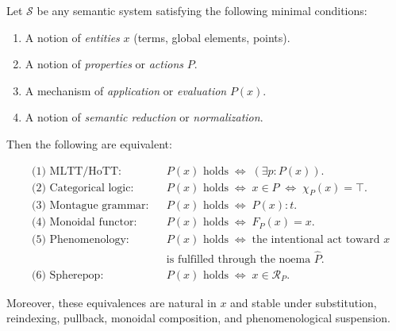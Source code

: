 \documentclass[12pt,letterpaper]{article}
\begin{document}
\begin{theorem}
Let $\mathcal{S}$ be any semantic system satisfying the following minimal
conditions:

\begin{enumerate}
    \item A notion of \emph{entities} $x$ (terms, global elements, points).
    \item A notion of \emph{properties} or \emph{actions} $P$.
    \item A mechanism of \emph{application} or \emph{evaluation} $P(x)$.
    \item A notion of \emph{semantic reduction} or \emph{normalization}.
\end{enumerate}

Then the following are equivalent:

\[
\boxed{
\begin{aligned}
&\text{(1) MLTT/HoTT:} && P(x) \text{ holds} \;\Longleftrightarrow\; (\exists p : P(x)). \\
&\text{(2) Categorical logic:} && P(x) \text{ holds} \;\Longleftrightarrow\; x \in P \;\Longleftrightarrow\; \chi_P(x)=\top. \\
&\text{(3) Montague grammar:} && P(x) \text{ holds} \;\Longleftrightarrow\; P(x) : t. \\
&\text{(4) Monoidal functor:} && P(x) \text{ holds} \;\Longleftrightarrow\; F_P(x) = x. \\
&\text{(5) Phenomenology:} && P(x) \text{ holds} \;\Longleftrightarrow\; \text{the intentional act toward } x \\
&&& \text{is fulfilled through the noema } \widehat{P}. \\
&\text{(6) Spherepop:} && P(x) \text{ holds} \;\Longleftrightarrow\; x \in \mathcal{R}_P.
\end{aligned}
}
\]

Moreover, these equivalences are natural in $x$ and stable under substitution,
reindexing, pullback, monoidal composition, and phenomenological suspension.

\end{theorem}
\end{document}
